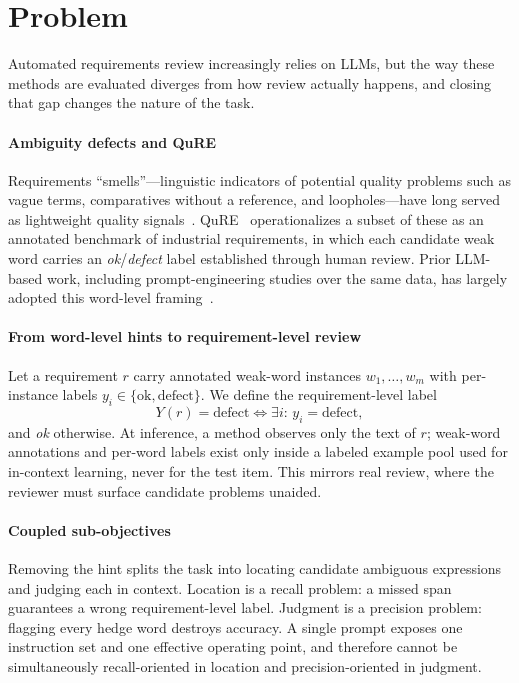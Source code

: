 \documentclass[10pt,conference]{IEEEtran}
\begin{document}
\section{Problem}
\label{sec:problem}
Automated requirements review increasingly relies on LLMs, but the way these methods are evaluated diverges from how review actually happens, and closing that gap changes the nature of the task.

\paragraph*{Ambiguity defects and QuRE}
Requirements ``smells''---linguistic indicators of potential quality problems such as vague terms, comparatives without a reference, and loopholes---have long served as lightweight quality signals~\cite{smells}. QuRE~\cite{qure} operationalizes a subset of these as an annotated benchmark of industrial requirements, in which each candidate weak word carries an \emph{ok}/\emph{defect} label established through human review. Prior LLM-based work, including prompt-engineering studies over the same data, has largely adopted this word-level framing~\cite{ape_anon}.

\paragraph*{From word-level hints to requirement-level review}
Let a requirement $r$ carry annotated weak-word instances $w_1,\dots,w_m$ with per-instance labels $y_i\in\{\text{ok},\text{defect}\}$. We define the requirement-level label
\[
Y(r) = \text{defect} \iff \exists i:\, y_i = \text{defect},
\]
and \emph{ok} otherwise. At inference, a method observes only the text of $r$; weak-word annotations and per-word labels exist only inside a labeled example pool used for in-context learning, never for the test item. This mirrors real review, where the reviewer must surface candidate problems unaided.

\paragraph*{Coupled sub-objectives}
Removing the hint splits the task into locating candidate ambiguous expressions and judging each in context. Location is a recall problem: a missed span guarantees a wrong requirement-level label. Judgment is a precision problem: flagging every hedge word destroys accuracy. A single prompt exposes one instruction set and one effective operating point, and therefore cannot be simultaneously recall-oriented in location and precision-oriented in judgment.
\end{document}

